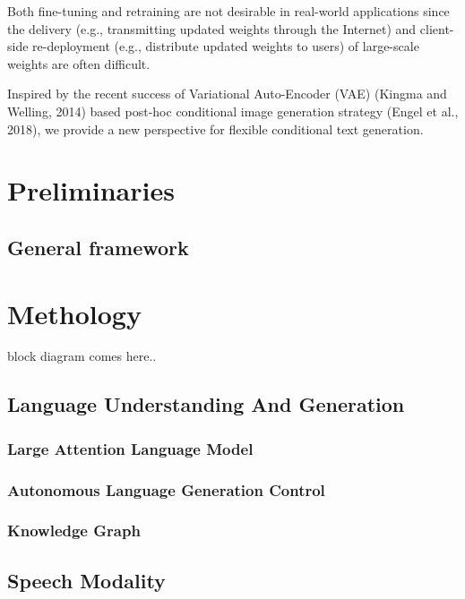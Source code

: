 \documentclass[11pt,a4paper]{article}
\begin{document}
Both fine-tuning and retraining are not desirable
in real-world applications since the delivery (e.g.,
transmitting updated weights through the Internet)
and client-side re-deployment (e.g., distribute updated weights to users) of large-scale weights are
often difficult.

Inspired by the recent success of Variational
Auto-Encoder (VAE) (Kingma and Welling, 2014)
based post-hoc conditional image generation strategy (Engel et al., 2018), we provide a new perspective for flexible conditional text generation. 


\section{Preliminaries}
\subsection{General framework}

\section{Methology}
block diagram comes here..

\subsection{Language Understanding And Generation} %
  
\subsubsection{Large Attention Language Model} %

\subsubsection{Autonomous Language Generation Control} %

\subsubsection{Knowledge Graph} %



\subsection{Speech Modality}
\end{document}
